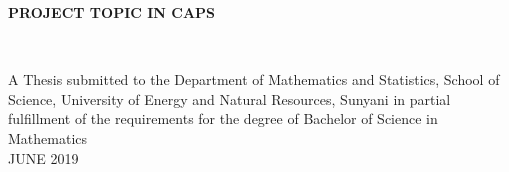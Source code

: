 \documentclass[12pt,a4paper]{book}
\begin{document}
	\begin{titlepage}
		\begin{center}
			{\normalfont \textbf{PROJECT TOPIC IN CAPS}}
			
			\vspace{3.7cm}
			{}\\
			\vspace{1cm}
			{}
			\vspace{1.7cm}
			
			
			\begin{center}
				{\normalfont A Thesis submitted to the Department of Mathematics and Statistics, School of Science, University of Energy and Natural Resources, Sunyani in partial fulfillment of the requirements for the degree of Bachelor of Science in Mathematics }\\
				\vspace{2cm}	
				{\normalfont JUNE 2019}
			\end{center}
			
		\end{center}
		
		\vfill
	\end{titlepage}	
	\newpage
\end{document}

